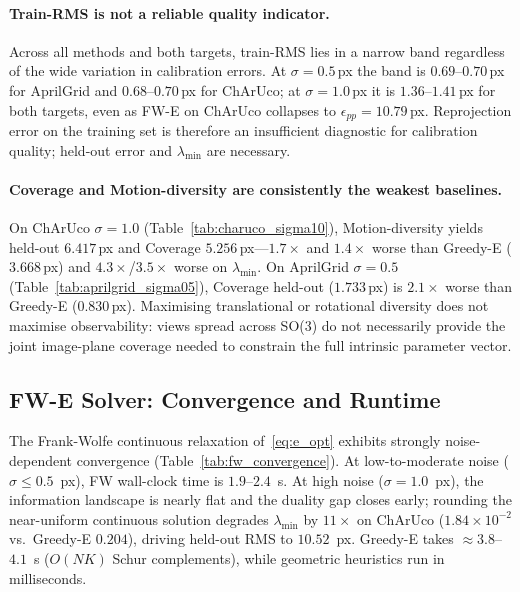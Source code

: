 \documentclass[11pt]{article}
\begin{document}
\paragraph{Train-RMS is not a reliable quality indicator.}
Across all methods and both targets, train-RMS lies in a narrow band
regardless of the wide variation in calibration errors.
At $\sigma{=}0.5$\,px the band is $0.69$--$0.70$\,px for AprilGrid and
$0.68$--$0.70$\,px for ChArUco; at $\sigma{=}1.0$\,px it is $1.36$--$1.41$\,px
for both targets, even as FW-E on ChArUco collapses to $\epsilon_{pp}{=}10.79$\,px.
Reprojection error on the training set is therefore an insufficient diagnostic
for calibration quality; held-out error and $\lambda_{\min}$ are necessary.

\paragraph{Coverage and Motion-diversity are consistently the weakest baselines.}
On ChArUco $\sigma{=}1.0$ (Table~\ref{tab:charuco_sigma10}), Motion-diversity
yields held-out $6.417$\,px and Coverage $5.256$\,px---$1.7{\times}$ and
$1.4{\times}$ worse than Greedy-E ($3.668$\,px) and $4.3{\times}$/$3.5{\times}$
worse on $\lambda_{\min}$.
On AprilGrid $\sigma{=}0.5$ (Table~\ref{tab:aprilgrid_sigma05}), Coverage
held-out ($1.733$\,px) is $2.1{\times}$ worse than Greedy-E ($0.830$\,px).
Maximising translational or rotational diversity does not maximise observability:
views spread across SO(3) do not necessarily provide the joint image-plane
coverage needed to constrain the full intrinsic parameter vector.

\subsection{FW-E Solver: Convergence and Runtime}
\label{subsec:fw_convergence}

The Frank-Wolfe continuous relaxation of~\eqref{eq:e_opt} exhibits strongly
noise-dependent convergence (Table~\ref{tab:fw_convergence}).
At low-to-moderate noise ($\sigma{\le}0.5$~px), FW wall-clock time is
$1.9$--$2.4$~s.
At high noise ($\sigma{=}1.0$~px), the information landscape is nearly flat
and the duality gap closes early; rounding the near-uniform continuous solution
degrades $\lambda_{\min}$ by $11\times$ on ChArUco
($1.84\!\times\!10^{-2}$ vs.\ Greedy-E $0.204$), driving held-out RMS
to $10.52$~px.
Greedy-E takes $\approx\!3.8$--$4.1$~s ($O(NK)$ Schur complements),
while geometric heuristics run in milliseconds.
\end{document}

